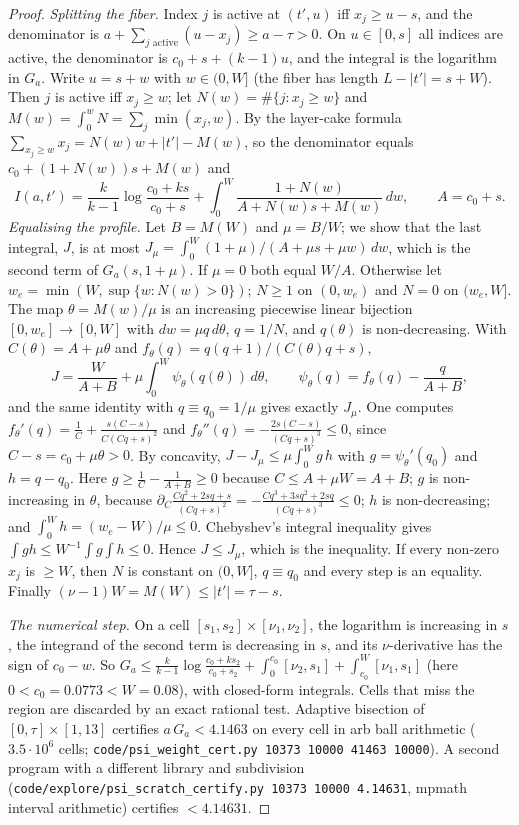 \documentclass[11pt]{amsart}
\theoremstyle{definition}
\theoremstyle{remark}
\begin{document}
\begin{proof}
\emph{Splitting the fiber.} Index $j$ is active at $(t',u)$ iff
$x_j\ge u-s$, and the denominator is $a+\sum_{j\text{ active}}(u-x_j)\ge a-\tau>0$.
On $u\in[0,s]$ all indices are active, the denominator is $c_0+s+(k-1)u$, and
the integral is the logarithm in $G_a$. Write $u=s+w$ with $w\in(0,W]$ (the
fiber has length $L-|t'|=s+W$). Then $j$ is active iff $x_j\ge w$; let
$N(w)=\#\{j:x_j\ge w\}$ and $M(w)=\int_0^wN=\sum_j\min(x_j,w)$. By the layer-cake
formula $\sum_{x_j\ge w}x_j=N(w)w+|t'|-M(w)$, so the denominator equals
$c_0+(1+N(w))s+M(w)$ and
\[
I(a,t')=\frac{k}{k-1}\log\frac{c_0+ks}{c_0+s}+\int_0^W\frac{1+N(w)}{A+N(w)s+M(w)}\,dw,\qquad A=c_0+s.
\]
\emph{Equalising the profile.} Let $B=M(W)$ and $\mu=B/W$; we show that the last
integral, $J$, is at most $J_\mu=\int_0^W(1+\mu)/(A+\mu s+\mu w)\,dw$, which is
the second term of $G_a(s,1+\mu)$. If $\mu=0$ both equal $W/A$. Otherwise let
$w_e=\min(W,\sup\{w:N(w)>0\})$; $N\ge1$ on $(0,w_e)$ and $N=0$ on $(w_e,W]$. The map
$\theta=M(w)/\mu$ is an increasing piecewise linear bijection $[0,w_e]\to[0,W]$
with $dw=\mu q\,d\theta$, $q=1/N$, and $q(\theta)$ is non-decreasing. With
$C(\theta)=A+\mu\theta$ and $f_\theta(q)=q(q+1)/(C(\theta)q+s)$,
\[
J=\frac{W}{A+B}+\mu\int_0^W\psi_\theta(q(\theta))\,d\theta,\qquad
\psi_\theta(q)=f_\theta(q)-\frac{q}{A+B},
\]
and the same identity with $q\equiv q_0=1/\mu$ gives exactly $J_\mu$. One computes
$f_\theta'(q)=\frac1C+\frac{s(C-s)}{C(Cq+s)^2}$ and
$f_\theta''(q)=-\frac{2s(C-s)}{(Cq+s)^3}\le0$, since $C-s=c_0+\mu\theta>0$.
By concavity, $J-J_\mu\le\mu\int_0^Wg\,h$ with $g=\psi_\theta'(q_0)$ and
$h=q-q_0$. Here $g\ge\frac1C-\frac1{A+B}\ge0$ because $C\le A+\mu W=A+B$; $g$ is
non-increasing in $\theta$, because
$\partial_C\frac{Cq^2+2sq+s}{(Cq+s)^2}=-\frac{Cq^3+3sq^2+2sq}{(Cq+s)^3}\le0$;
$h$ is non-decreasing; and $\int_0^Wh=(w_e-W)/\mu\le0$. Chebyshev's integral
inequality gives $\int gh\le W^{-1}\int g\int h\le0$. Hence $J\le J_\mu$, which is
the inequality. If every non-zero $x_j$ is $\ge W$, then $N$ is constant on
$(0,W]$, $q\equiv q_0$ and every step is an equality. Finally
$(\nu-1)W=M(W)\le|t'|=\tau-s$.

\emph{The numerical step.} On a cell $[s_1,s_2]\times[\nu_1,\nu_2]$, the
logarithm is increasing in $s$, the integrand of the second term is decreasing
in $s$, and its $\nu$-derivative has the sign of $c_0-w$. So
$G_a\le\frac{k}{k-1}\log\frac{c_0+ks_2}{c_0+s_2}+\int_0^{c_0}[\nu_2,s_1]+\int_{c_0}^W[\nu_1,s_1]$
(here $0<c_0=0.0773<W=0.08$), with closed-form integrals. Cells that miss the
region are discarded by an exact rational test. Adaptive bisection of
$[0,\tau]\times[1,13]$ certifies $a\,G_a<4.1463$ on every cell in arb ball
arithmetic ($3.5\cdot10^6$ cells; \texttt{code/psi\_weight\_cert.py 10373 10000 41463 10000}).
A second program with a different library and subdivision
(\texttt{code/explore/psi\_scratch\_certify.py 10373 10000 4.14631}, mpmath
interval arithmetic) certifies $<4.14631$.
\end{proof}
\end{document}
